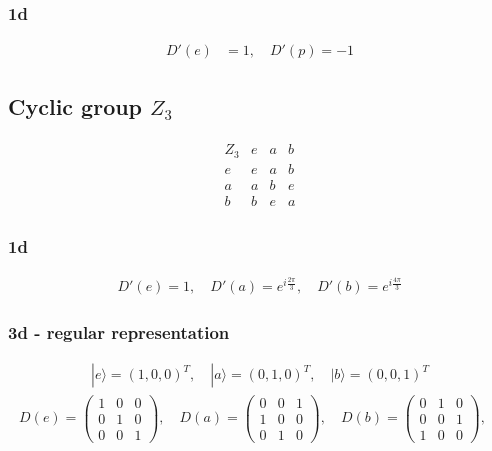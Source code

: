\documentclass[10pt,a4paper]{book}
\theoremstyle{definition}
\begin{document}
\subsubsection{1d}
\begin{align}
D'(e)&=1,\quad D'(p)=-1
\end{align}

\subsection{Cyclic group \texorpdfstring{$Z_3$}{TEXT}}
\begin{align}
\begin{array}{c||ccc}
Z_3 & e & a & b \\ \hline\hline
e & e & a & b \\
a & a & b & e \\
b & b & e & a
\end{array}
\end{align}
\subsubsection{1d}
\begin{align}
D'(e)=1,\quad D'(a)=e^{i\frac{2\pi}{3}},\quad D'(b)=e^{i\frac{4\pi}{3}}
\end{align}


\subsubsection{3d - regular representation}
\begin{align}
|e\rangle=(1,0,0)^T,\quad |a\rangle=(0,1,0)^T,\quad |b\rangle=(0,0,1)^T
\end{align}
\begin{align}
D(e)=\left(\begin{array}{ccc}
1 & 0 & 0 \\
0 & 1 & 0 \\
0 & 0 & 1 
\end{array}
\right),\quad
D(a)=\left(\begin{array}{ccc}
0 & 0 & 1 \\
1 & 0 & 0 \\
0 & 1 & 0 
\end{array}
\right),\quad
D(b)=\left(\begin{array}{ccc}
0 & 1 & 0 \\
0 & 0 & 1 \\
1 & 0 & 0 
\end{array}
\right),\quad
\end{align}
\end{document}
